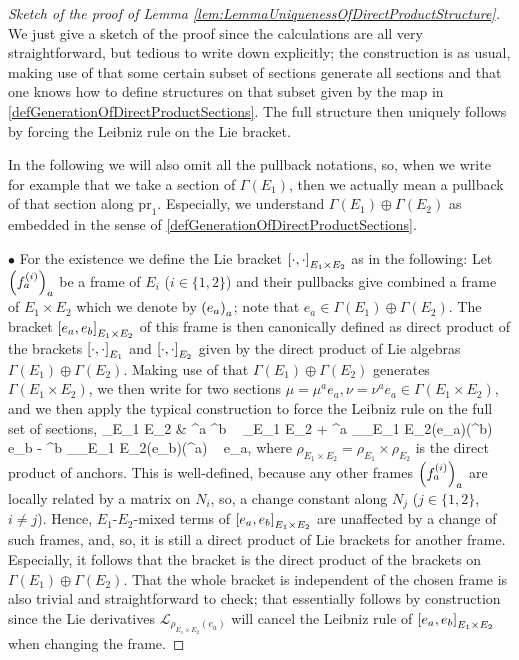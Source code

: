 \begin{proof}[Sketch of the proof of Lemma \ref{lem:LemmaUniquenessOfDirectProductStructure}]
\leavevmode\newline
We just give a sketch of the proof since the calculations are all very straightforward, but tedious to write down explicitly; the construction is as usual, making use of that some certain subset of sections generate all sections and that one knows how to define structures on that subset given by the map in \eqref{defGenerationOfDirectProductSections}. The full structure then uniquely follows by forcing the Leibniz rule on the Lie bracket.

In the following we will also omit all the pullback notations, so, when we write for example that we take a section of $\Gamma(E_1)$, then we actually mean a pullback of that section along $\mathrm{pr}_1$. Especially, we understand $\Gamma(E_1) \oplus \Gamma(E_2)$ as embedded in the sense of \eqref{defGenerationOfDirectProductSections}.

$\bullet$ For the existence we define the Lie bracket $\mleft[ \cdot, \cdot \mright]_{E_1 \times E_2}$ as in the following: Let $\mleft( f_a^{(i)} \mright)_a$ be a frame of $E_i$ ($i \in \{1,2\}$) and their pullbacks give combined a frame of $E_1 \times E_2$ which we denote by $\mleft( e_a \mright)_a$; note that $e_a \in \Gamma(E_1) \oplus \Gamma(E_2)$. The bracket $\mleft[ e_a, e_b \mright]_{E_1 \times E_2}$ of this frame is then canonically defined as direct product of the brackets $\mleft[ \cdot, \cdot \mright]_{E_1}$ and $\mleft[ \cdot, \cdot \mright]_{E_2}$ given by the direct product of Lie algebras $\Gamma(E_1) \oplus \Gamma(E_2)$. Making use of that $\Gamma(E_1) \oplus \Gamma(E_2)$ generates $\Gamma(E_1 \times E_2)$, we then write for two sections $\mu = \mu^a e_a, \nu = \nu^a e_a \in \Gamma(E_1 \times E_2)$, and we then apply the typical construction to force the Leibniz rule on the full set of sections,
\ba\label{1defLieBracketOfDirectProductAlgebroids}
\mleft[ \mu, \nu \mright]_{E_1 \times E_2}
&\coloneqq
\mu^a \nu^b ~ \mleft[ e_a, e_b \mright]_{E_1 \times E_2}
	+ \mu^a _{\rho_{E_1 \times E_2}(e_a)}\mleft(\nu^b\mright) ~ e_b
	- \nu^b _{\rho_{E_1 \times E_2}(e_b)}\mleft(\mu^a\mright) ~ e_a,
\ea
where $\rho_{E_1 \times E_2} = \rho_{E_1} \times \rho_{E_2}$ is the direct product of anchors. This is well-defined, because any other frames $\mleft( f_a^{(i)} \mright)_a$ are locally related by a matrix on $N_i$, so, a change constant along $N_j$ ($j \in \{1,2\}$, $i \neq j$). Hence, $E_1$-$E_2$-mixed terms of $\mleft[ e_a, e_b \mright]_{E_1 \times E_2}$ are unaffected by a change of such frames, and, so, it is still a direct product of Lie brackets for another frame. Especially, it follows that the bracket is the direct product of the brackets on $\Gamma(E_1) \oplus \Gamma(E_2)$. That the whole bracket is independent of the chosen frame is also trivial and straightforward to check; that essentially follows by construction since the Lie derivatives $\mathcal{L}_{\rho_{E_1 \times E_2}(e_a)}$ will cancel the Leibniz rule of $\mleft[ e_a, e_b \mright]_{E_1 \times E_2}$ when changing the frame.


\end{proof}
